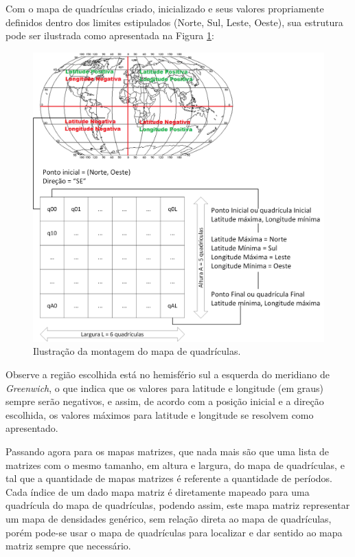 Com o mapa de quadrículas criado, inicializado e seus valores propriamente definidos dentro dos limites estipulados (Norte, Sul, Leste, Oeste), sua estrutura pode ser ilustrada como apresentada na Figura \ref{fig:Ilustrations-QuadricMap}: 


\begin{figure}[h]
	\centering
	\includegraphics[scale=0.6]{Figuras/Ilustrations-QuadricMap.png}
	\caption{Ilustração da montagem do mapa de quadrículas.}
	\label{fig:Ilustrations-QuadricMap}
\end{figure}


Observe a região escolhida está no hemisfério sul a esquerda do meridiano de \emph{Greenwich}, o que indica que os valores para latitude e longitude (em graus) sempre serão negativos, e assim, de acordo com a posição inicial e a direção escolhida, os valores máximos para latitude e longitude se resolvem como apresentado.

Passando agora para os mapas matrizes, que nada mais são que uma lista de matrizes com o mesmo tamanho, em altura e largura, do mapa de quadrículas, e tal que a quantidade de mapas matrizes é referente a quantidade de períodos. Cada índice de um dado mapa matriz é diretamente mapeado para uma quadrícula do mapa de quadrículas, podendo assim, este mapa matriz representar um mapa de densidades genérico, sem relação direta ao mapa de quadrículas, porém pode-se usar o mapa de quadrículas para localizar e dar sentido ao mapa matriz sempre que necessário. 

